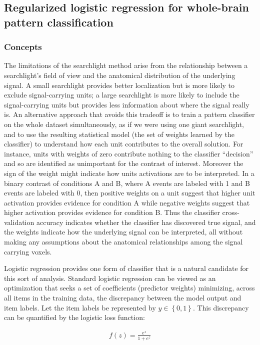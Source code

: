 \subsection{Regularized logistic regression for whole-brain pattern classification}
\subsubsection{Concepts}
The limitations of the searchlight method arise from the relationship between a searchlight's field of view and the anatomical distribution of the underlying signal. A small searchlight provides better localization but is more likely to exclude signal-carrying units; a large searchlight is more likely to include the signal-carrying units but provides less information about where the signal really is. An alternative approach that avoids this tradeoff is to train a pattern classifier on the whole dataset simultaneously, as if we were using one giant searchlight, and to use the resulting statistical model (the set of weights learned by the classifier) to understand how each unit contributes to the overall solution. For instance, units with weights of zero contribute nothing to the classifier ``decision'' and so are identified as unimportant for the contrast of interest. Moreover the sign of the weight might indicate how units activations are to be interpreted. In a binary contrast of conditions A and B, where A events are labeled with 1 and B events are labeled with 0, then positive weights on a unit suggest that higher unit activation provides evidence for condition A while negative weights suggest that higher activation provides evidence for condition B. Thus the classifier cross-validation accuracy indicates whether the classifier has discovered true signal, and the weights indicate how the underlying signal can be interpreted, all without making any assumptions about the anatomical relationships among the signal carrying voxels.

Logistic regression provides one form of classifier that is a natural candidate for this sort of analysis. Standard logistic regression can be viewed as an optimization that seeks a set of coefficients (predictor weights) minimizing, across all items in the training data, the discrepancy between the model output and item labels. Let the item labels be represented by $y\in{\left\{0,1\right\}}$.  This discrepancy can be quantified by the logistic loss function:

\begin{align}
f(z) = \frac{e^z}{1+e^{z}}
\label{eq.logisticloss}
\end{align}

